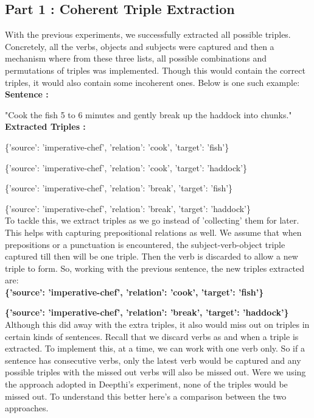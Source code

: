 \documentclass[11pt,letterpaper]{article}
\begin{document}
\subsection{Part 1 : Coherent Triple Extraction}
With the previous experiments, we successfully extracted all possible triples. Concretely, all the verbs, objects and subjects were captured and then a mechanism where from these three lists, all possible combinations and permutations of triples was implemented.
Though this would contain the correct triples, it would also contain some incoherent ones. Below is one such example:
\newpage
\textbf{Sentence : } 

"Cook the fish 5 to 6 minutes and gently break up the haddock into chunks."\\

\textbf{Extracted Triples : }

\{'source': 'imperative-chef', 'relation': 'cook', 'target': 'fish'\}

\{'source': 'imperative-chef', 'relation': 'cook', 'target': 'haddock'\}

\{'source': 'imperative-chef', 'relation': 'break', 'target': 'fish'\}

\{'source': 'imperative-chef', 'relation': 'break', 'target': 'haddock'\}\\

To tackle this, we extract triples as we go instead of 'collecting' them for later. This helps with capturing prepositional relations as well. We assume that when prepositions or a punctuation is encountered, the subject-verb-object triple captured till then will be one triple. Then the verb is discarded to allow a new triple to form. So, working with the previous sentence, the new triples extracted are:\\

\textbf{\{'source': 'imperative-chef', 'relation': 'cook', 'target': 'fish'\}}

\textbf{\{'source': 'imperative-chef', 'relation': 'break', 'target': 'haddock'\}}\\

Although this did away with the extra triples, it also would miss out on triples in certain kinds of sentences. Recall that we discard verbs as and when a triple is extracted. To implement this, at a time, we can work with one verb only. So if a sentence has consecutive verbs, only the latest verb would be captured and any possible triples with the missed out verbs will also be missed out. Were we using the approach adopted in Deepthi's experiment, none of the triples would be missed out. To understand this better here's a comparison between the two approaches.\\
\end{document}
